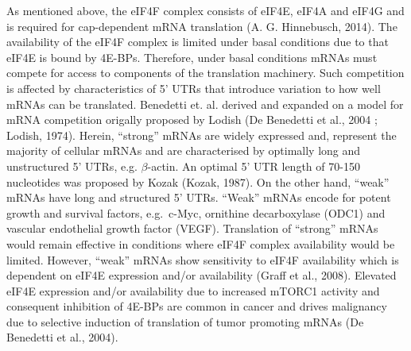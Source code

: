 \documentclass[12pt,openany]{book}
\begin{document}
As mentioned above, the eIF4F complex consists of eIF4E, eIF4A and eIF4G
and is required for cap-dependent mRNA translation (A. G. Hinnebusch,
2014). The availability of the eIF4F complex is limited under basal
conditions due to that eIF4E is bound by 4E-BPs. Therefore, under basal
conditions mRNAs must compete for access to components of the
translation machinery. Such competition is affected by characteristics
of 5' UTRs that introduce variation to how well mRNAs can be translated.
Benedetti et. al. derived and expanded on a model for mRNA competition
origally proposed by Lodish (De Benedetti et al., 2004 ; Lodish, 1974).
Herein, ``strong'' mRNAs are widely expressed and, represent the
majority of cellular mRNAs and are characterised by optimally long and
unstructured 5' UTRs, e.g. \(\beta\)-actin. An optimal 5' UTR length of
70-150 nucleotides was proposed by Kozak (Kozak, 1987). On the other
hand, ``weak'' mRNAs have long and structured 5' UTRs. ``Weak'' mRNAs
encode for potent growth and survival factors, e.g.~c-Myc, ornithine
decarboxylase (ODC1) and vascular endothelial growth factor (VEGF).
Translation of ``strong'' mRNAs would remain effective in conditions
where eIF4F complex availability would be limited. However, ``weak''
mRNAs show sensitivity to eIF4F availability which is dependent on eIF4E
expression and/or availability (Graff et al., 2008). Elevated eIF4E
expression and/or availability due to increased mTORC1 activity and
consequent inhibition of 4E-BPs are common in cancer and drives
malignancy due to selective induction of translation of tumor promoting
mRNAs (De Benedetti et al., 2004).
\end{document}
